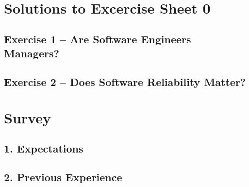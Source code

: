 \documentclass{scrartcl}
\begin{document}
\section*{Solutions to Excercise Sheet 0}

\subsection*{Exercise 1 – Are Software Engineers Managers?}

\subsection*{Exercise 2 – Does Software Reliability Matter?}



\section*{Survey}

\subsection*{1. Expectations}

\subsection*{2. Previous Experience}
\end{document}
